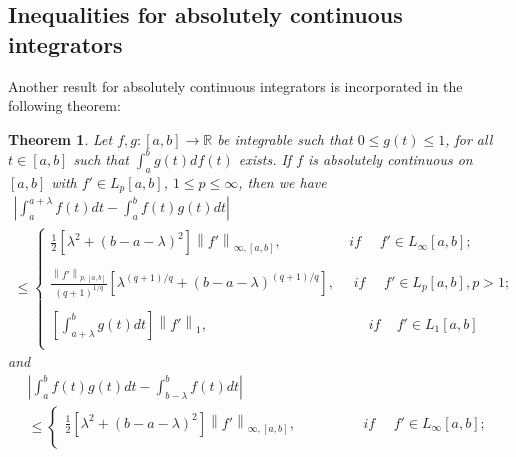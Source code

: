 \documentclass{amsart}
\newtheorem{theorem}{Theorem}
\theoremstyle{plain}
\numberwithin{equation}{section}
\begin{document}
\subsection{Inequalities for absolutely continuous integrators}

Another result for absolutely continuous integrators is
incorporated in the following theorem:
\begin{theorem}
\label{thm5}Let $f,g: [a,b] \to \mathbb{R}$ be integrable such
that $0 \le g(t) \le 1$, for all $t \in [a,b]$ such that $\int_a^b
{g\left( t \right)df\left( t \right)}$ exists. If $f$ is
absolutely continuous on $[a,b]$ with $f' \in L_p[a,b]$, $1 \le p
\le \infty$, then we have
\begin{multline}
\label{eq2.16}\left| {\int_a^{a + \lambda } {f\left( t \right)dt -
\int_a^b {f\left( t \right)g\left( t \right)dt} } } \right|
\\
\le \left\{
\begin{array}{l}
 \frac{1}{2}\left[ {\lambda ^2  + \left( {b - a - \lambda }
\right)^2 } \right] \left\| {f'} \right\|_{\infty ,\left[ {a,b}
\right]},\,\,\,\,\,\,\,\,\,\,\,\,\,\,\,\,\,\,\,\,\,\,\,\,\,\,\,\,\,if\,\,\,\,\,\,\,\,f' \in L_\infty  [a,b]; \\
  \\
 \frac{\left\| {f'} \right\|_{p ,\left[ {a,b}
\right]}}{{\left( {q + 1} \right)^{1/q} }} \left[ {\lambda
^{\left( {q + 1} \right)/q}  + \left( {b - a - \lambda }
\right)^{\left( {q + 1} \right)/q} } \right],\,\,\,\,\,\,\,\,if\,\,\,\,\,\,\,\,f' \in L_p [a,b],p > 1; \\
  \\
 \left[ \int_{a + \lambda }^b {g\left( t \right)dt}
\right]\left\| {f'} \right\|_1 ,\,\,\,\,\,\,\,\,\,\,\,\,\,\,\,\,\,\,\,\,\,\,\,\,\,\,\,\,\,\,\,\,\,\,\,\,\,\,\,\,\,\,\,\,\,\,\,\,\,\,\,\,\,\,\,\,\,\,\,\,\,\,\,\,\,\,\,\,\,if\,\,\,\,\,\,\,f' \in L_1 [a,b] \\
 \end{array} \right.
\end{multline}
and
\begin{multline}
\label{eq2.17}\left| {\int_a^b {f\left( t \right)g\left( t
\right)dt - \int_{b - \lambda }^b {f\left( t \right)dt} } }
\right|
\\
\le \left\{
\begin{array}{l}
 \frac{1}{2}\left[ {\lambda ^2  + \left( {b - a - \lambda }
\right)^2 } \right] \left\| {f'} \right\|_{\infty ,\left[ {a,b}
\right]},\,\,\,\,\,\,\,\,\,\,\,\,\,\,\,\,\,\,\,\,\,\,\,\,\,\,\,\,\,if\,\,\,\,\,\,\,\,f' \in L_\infty  [a,b]; \\

\end{array}
\end{multline}
\end{theorem}
\end{document}
